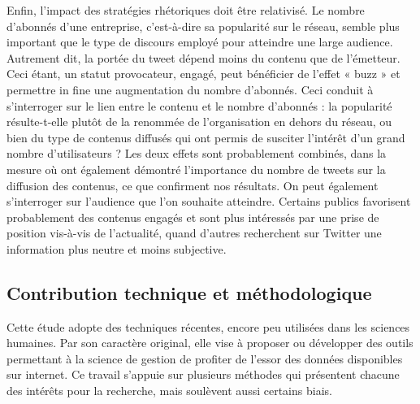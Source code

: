             Enfin, l’impact des stratégies rhétoriques doit être relativisé. Le nombre d’abonnés d’une entreprise, c’est-à-dire sa popularité sur le réseau, semble plus important que le type de discours employé pour atteindre une large audience. Autrement dit, la portée du tweet dépend moins du contenu que de l’émetteur. Ceci étant, un statut provocateur, engagé, peut bénéficier de l’effet « buzz » et permettre in fine une augmentation du nombre d’abonnés. Ceci conduit à s’interroger sur le lien entre le contenu et le nombre d’abonnés : la popularité résulte-t-elle plutôt de la renommée de l’organisation en dehors du réseau, ou bien du type de contenus diffusés qui ont permis de susciter l’intérêt d’un grand nombre d’utilisateurs ? Les deux effets sont probablement combinés, dans la mesure où \textcite{guo2017speaking} ont également démontré l’importance du nombre de tweets sur la diffusion des contenus, ce que confirment nos résultats. On peut également s’interroger sur l’audience que l’on souhaite atteindre. Certains publics favorisent probablement des contenus engagés et sont plus intéressés par une prise de position vis-à-vis de l’actualité, quand d’autres recherchent sur Twitter une information plus neutre et moins subjective.


    \subsection{Contribution technique et méthodologique}

        Cette étude adopte des techniques récentes, encore peu utilisées dans les sciences humaines. Par son caractère original, elle vise à proposer ou développer des outils permettant à la science de gestion de profiter de l'essor des données disponibles sur internet.  Ce travail s'appuie sur plusieurs méthodes qui présentent chacune des intérêts pour la recherche, mais soulèvent aussi certains biais. \\

